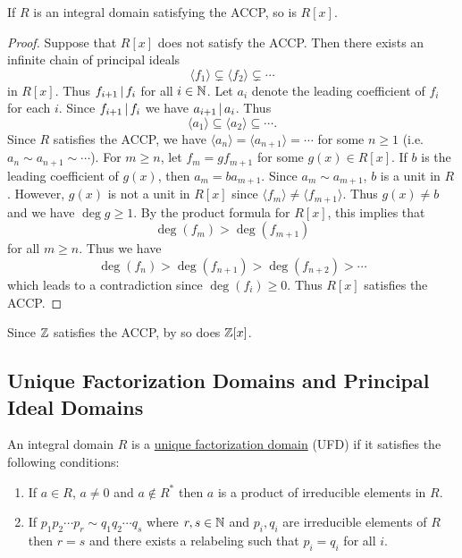 \documentclass[11pt]{article}
\begin{document}
\begin{theorem}
    If $R$ is an integral domain satisfying the ACCP, so is $R[x]$.
\end{theorem}

\begin{proof}
    Suppose that $R[x]$ does not satisfy the ACCP. Then there exists an infinite chain of principal ideals
    \[\langle f_1\rangle\subsetneq\langle f_2\rangle\subsetneq\cdots\]
    in $R[x]$. Thus $f_{i+1}\,|\, f_i$ for all $i\in\mathbb{N}$. Let $a_i$ denote the leading coefficient of $f_i$ for each $i$. Since $f_{i+1}\,|\, f_i$ we have $a_{i+1}\,|\, a_i$. Thus
    \[\langle a_1\rangle\subseteq\langle a_2\rangle\subseteq\cdots.\]
    Since $R$ satisfies the ACCP, we have $\langle a_n\rangle=\langle a_{n+1}\rangle=\cdots$ for some $n\geq1$ (i.e. $a_n\sim a_{n+1}\sim\cdots$). For $m\geq n$, let $f_m=gf_{m+1}$ for some $g(x)\in R[x]$. If $b$ is the leading coefficient of $g(x)$, then $a_m=ba_{m+1}$. Since $a_m\sim a_{m+1}$, $b$ is a unit in $R$. However, $g(x)$ is not a unit in $R[x]$ since $\langle f_m\rangle\neq\langle f_{m+1}\rangle$. Thus $g(x)\neq b$ and we have $\deg g\geq1$. By the product formula for $R[x]$, this implies that
    \[\deg(f_m)>\deg(f_{m+1})\]
    for all $m\geq n$. Thus we have
    \[\deg(f_n)>\deg(f_{n+1})>\deg(f_{n+2})>\cdots\]
    which leads to a contradiction since $\deg(f_i)\geq0$. Thus $R[x]$ satisfies the ACCP.
    
\end{proof}

\begin{example}
    Since $\mathbb{Z}$ satisfies the ACCP, by  so does $\mathbb{Z}[x]$.
\end{example}

\subsection{Unique Factorization Domains and Principal Ideal Domains}

\begin{definition}
    An integral domain $R$ is a \ul{unique factorization domain} (UFD) if it satisfies the following conditions:
    \begin{enumerate}
        \item If $a\in R$, $a\neq0$ and $a\not\in R^*$ then $a$ is a product of irreducible elements in $R$.
        \item If $p_1p_2\cdots p_r\sim q_1q_2\cdots q_s$ where $r,s\in\mathbb{N}$ and $p_i,q_i$ are irreducible elements of $R$ then $r=s$ and there exists a relabeling such that $p_i=q_i$ for all $i$.
    \end{enumerate}
\end{definition}
\end{document}
